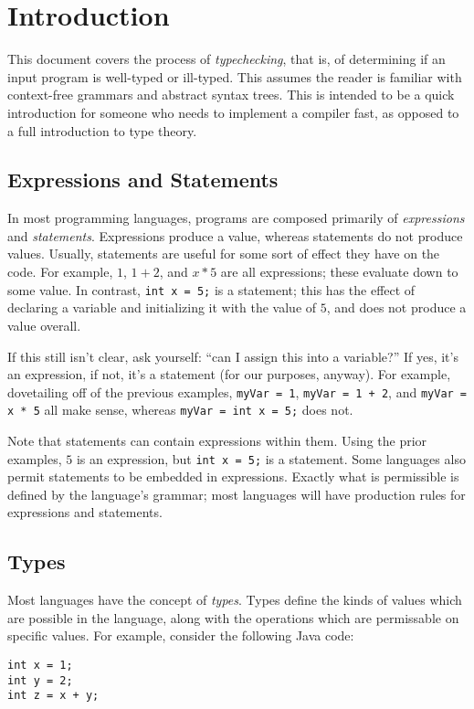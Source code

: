 \section{Introduction}
This document covers the process of \emph{typechecking}, that is, of determining if an input program is well-typed or ill-typed.
This assumes the reader is familiar with context-free grammars and abstract syntax trees.
This is intended to be a quick introduction for someone who needs to implement a compiler fast, as opposed to a full introduction to type theory.

\subsection{Expressions and Statements}
In most programming languages, programs are composed primarily of \emph{expressions} and \emph{statements}.
Expressions produce a value, whereas statements do not produce values.
Usually, statements are useful for some sort of effect they have on the code.
For example, $1$, $1 + 2$, and $x * 5$ are all expressions; these evaluate down to some value.
In contrast, \texttt{int x = 5;} is a statement; this has the effect of declaring a variable and initializing it with the value of $5$, and does not produce a value overall.

If this still isn't clear, ask yourself: ``can I assign this into a variable?''
If yes, it's an expression, if not, it's a statement (for our purposes, anyway).
For example, dovetailing off of the previous examples, \texttt{myVar = 1}, \texttt{myVar = 1 + 2}, and \texttt{myVar = x * 5} all make sense, whereas \texttt{myVar = int x = 5;} does not.

Note that statements can contain expressions within them.
Using the prior examples, $5$ is an expression, but \texttt{int x = 5;} is a statement.
Some languages also permit statements to be embedded in expressions.
Exactly what is permissible is defined by the language's grammar; most languages will have production rules for expressions and statements.

\subsection{Types}
Most languages have the concept of \emph{types}.
Types define the kinds of values which are possible in the language, along with the operations which are permissable on specific values.
For example, consider the following Java code:

\begin{verbatim}
int x = 1;
int y = 2;
int z = x + y;
\end{verbatim}

